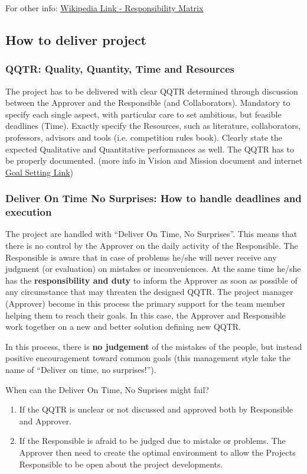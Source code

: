 \documentclass[graybox]{svmult}
\begin{document}
For other info: \href{https://en.wikipedia.org/wiki/Responsibility_assignment_matrix}{Wikipedia Link -  Responsibility Matrix}


\subsection{How to deliver project}
\subsubsection{QQTR: Quality, Quantity, Time and Resources}
The project has to be delivered with clear QQTR determined through discussion between the Approver and the Responsible (and Collaborators).
Mandatory to specify each single aspect, with particular care to set ambitious, but feasible deadlines (Time). Exactly specify the Resources, such as literature, collaborators, professors, advisors and tools (i.e. competition rules book). Clearly state the expected Qualitative and Quantitative performances as well.
The QQTR has to be properly documented.
(more info in Vision and Mission document and internet \href{https://mikecardus.com/shared-language-of-goal-setting-will-ensure-goals-are-understood/}{Goal Setting Link})

\subsubsection{Deliver On Time No Surprises: How to handle deadlines and execution}
The project are handled with “Deliver On Time, No Surprises”. This means that there is no control by the Approver on the daily activity of the Responsible. The Responsible is aware that in case of problems he/she will never receive any judgment (or evaluation) on mistakes or inconveniences. At the same time he/she has the \textbf{responsibility and duty} to inform the Approver as soon as possible of any circumstance that may threaten the designed QQTR. The project manager (Approver) become in this process the primary support for the team member helping them to reach their goals.
In this case, the Approver and Responsible work together on a new and better solution defining new QQTR.

In this process, there is \textbf{no judgement} of the mistakes of the people, but instead positive encouragement toward common goals (this management style take the name of “Deliver on time, no surprises!”).

\begin{svgraybox}
When can the Deliver On Time, No Suprises might fail?
\begin{enumerate}
\item If the QQTR is unclear or not discussed and approved both by Responsible and Approver.
\item If the Responsible is afraid to be judged due to mistake or problems. The Approver then need to create the optimal environment to allow the Projects Responsible to be open about the project developments.
\end{enumerate}
\end{svgraybox}
\end{document}
